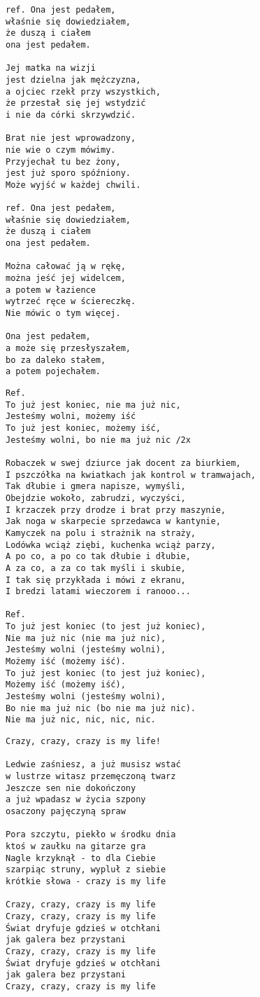 \documentclass[12pt]{article}
\begin{document}
\begin{verbatim}
ref. Ona jest pedałem,
właśnie się dowiedziałem,
że duszą i ciałem
ona jest pedałem.

Jej matka na wizji
jest dzielna jak mężczyzna,
a ojciec rzekł przy wszystkich,
że przestał się jej wstydzić
i nie da córki skrzywdzić.

Brat nie jest wprowadzony,
nie wie o czym mówimy.
Przyjechał tu bez żony,
jest już sporo spóźniony.
Może wyjść w każdej chwili.

ref. Ona jest pedałem,
właśnie się dowiedziałem,
że duszą i ciałem
ona jest pedałem.

Można całować ją w rękę,
można jeść jej widelcem,
a potem w łazience
wytrzeć ręce w ściereczkę.
Nie mówic o tym więcej.

Ona jest pedałem,
a może się przesłyszałem,
bo za daleko stałem,
a potem pojechałem.
\end{verbatim}
\clearpage

\begin{verbatim}
Ref.
To już jest koniec, nie ma już nic,
Jesteśmy wolni, możemy iść
To już jest koniec, możemy iść,
Jesteśmy wolni, bo nie ma już nic /2x

Robaczek w swej dziurce jak docent za biurkiem,
I pszczółka na kwiatkach jak kontrol w tramwajach,
Tak dłubie i gmera napisze, wymyśli,
Obejdzie wokoło, zabrudzi, wyczyści,
I krzaczek przy drodze i brat przy maszynie,
Jak noga w skarpecie sprzedawca w kantynie,
Kamyczek na polu i strażnik na straży,
Lodówka wciąż ziębi, kuchenka wciąż parzy,
A po co, a po co tak dłubie i dłubie,
A za co, a za co tak myśli i skubie,
I tak się przykłada i mówi z ekranu,
I bredzi latami wieczorem i ranooo...

Ref.
To już jest koniec (to jest już koniec),
Nie ma już nic (nie ma już nic),
Jesteśmy wolni (jesteśmy wolni),
Możemy iść (możemy iść).
To już jest koniec (to jest już koniec),
Możemy iść (możemy iść),
Jesteśmy wolni (jesteśmy wolni),
Bo nie ma już nic (bo nie ma już nic).
Nie ma już nic, nic, nic, nic.
\end{verbatim}
\clearpage

\begin{verbatim}
Crazy, crazy, crazy is my life!

Ledwie zaśniesz, a już musisz wstać
w lustrze witasz przemęczoną twarz
Jeszcze sen nie dokończony
a już wpadasz w życia szpony
osaczony pajęczyną spraw

Pora szczytu, piekło w środku dnia
ktoś w zaułku na gitarze gra
Nagle krzyknął - to dla Ciebie
szarpiąc struny, wypluł z siebie
krótkie słowa - crazy is my life

Crazy, crazy, crazy is my life
Crazy, crazy, crazy is my life
Świat dryfuje gdzieś w otchłani
jak galera bez przystani
Crazy, crazy, crazy is my life
Świat dryfuje gdzieś w otchłani
jak galera bez przystani
Crazy, crazy, crazy is my life
\end{verbatim}
\clearpage
\end{document}
